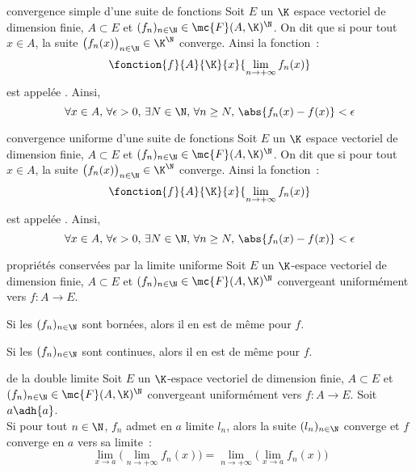 

\begin{adjustwidth}{-3cm}{-3cm}


\begin{definition}{9.1}{convergence simple d'une suite de fonctions}
    Soit $E$ un $\K$ espace vectoriel de dimension finie, $A \subset E$ et $(f_n)_{n \in \N} \in \mc{F}(A,\K)^\N$. On dit que  si pour tout $x \in A$, la suite $\big(f_n(x)\big)_{n \in \N} \in \K^\N$ converge. Ainsi la fonction~:
    $$\fonction{f}{A}{\K}{x}{\lim_{n \to +\infty}f_n(x)}$$
    est appelée . Ainsi,
    $$\forall x \in A,\, \forall \epsilon >0,\, \exists N\in \N,\, \forall n \geq N,\, \abs{f_n(x) - f(x)} < \epsilon$$
\end{definition}

\begin{definition}{9.4}{convergence uniforme d'une suite de fonctions}
    Soit $E$ un $\K$ espace vectoriel de dimension finie, $A \subset E$ et $(f_n)_{n \in \N} \in \mc{F}(A,\K)^\N$. On dit que  si pour tout $x \in A$, la suite $\big(f_n(x)\big)_{n \in \N} \in \K^\N$ converge. Ainsi la fonction~:
    $$\fonction{f}{A}{\K}{x}{\lim_{n \to +\infty}f_n(x)}$$
    est appelée . Ainsi,
    $$\forall x \in A,\, \forall \epsilon >0,\, \exists N\in \N,\, \forall n \geq N,\, \abs{f_n(x) - f(x)} < \epsilon$$
\end{definition}

\begin{theoreme}{9.15}{propriétés conservées par la limite uniforme}
    Soit $E$ un $\K$-espace vectoriel de dimension finie, $A \subset E$ et $(f_n)_{n \in \N} \in \mc{F}(A,\K)^\N$ convergeant uniformément vers $f:A\to E$.
    \begin{enumeratebf}
        \item Si les $(f_n)_{n \in \N}$ sont bornées, alors il en est de même pour $f$.
        \item Si les $(f_n)_{n \in \N}$ sont continues, alors il en est de même pour $f$.
    \end{enumeratebf}
\end{theoreme}\begin{theoreme}{9.17}{de la double limite}
    Soit $E$ un $\K$-espace vectoriel de dimension finie, $A \subset E$ et $(f_n)_{n \in \N} \in \mc{F}(A,\K)^\N$ convergeant uniformément vers $f:A\to E$. Soit $a \adh{a}$.\\
    Si pour tout $n \in \N$, $f_n$ admet en $a$ limite $l_n$, alors la suite $(l_n)_{n \in \N}$ converge et $f$ converge en $a$ vers sa limite~:
    $$\lim_{x \to a} \bigg(\lim_{n \to + \infty} f_n(x)\bigg) = \lim_{n \to + \infty} \bigg(\lim_{x \to a} f_n(x)\bigg)$$
\end{theoreme}


\end{adjustwidth}
